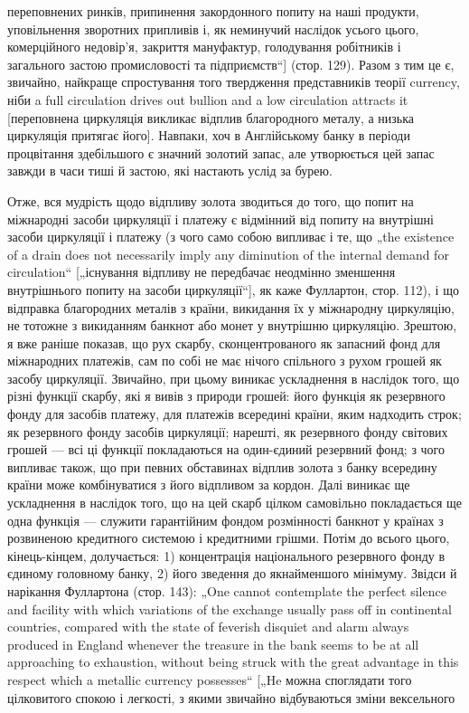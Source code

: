 переповнених ринків, припинення закордонного попиту на наші
продукти, уповільнення зворотних припливів і, як неминучий
наслідок усього цього, комерційного недовір’я, закриття мануфактур,
голодування робітників і загального застою промисловості
та підприємств“] (стор. 129). Разом з тим це є, звичайно,
найкраще спростування того твердження представників теорії
currency, ніби a full circulation drives out bullion and a low circulation
attracts it [переповнена циркуляція викликає відплив благородного
металу, а низька циркуляція притягає його]. Навпаки,
хоч в Англійському банку в періоди процвітання здебільшого є
значний золотий запас, але утворюється цей запас завжди в часи
тиші й застою, які настають услід за бурею.

Отже, вся мудрість щодо відпливу золота зводиться до того,
що попит на міжнародні засоби циркуляції і платежу є відмінний
від попиту на внутрішні засоби циркуляції і платежу (з чого
само собою випливає і те, що „the existence of a drain does not
necessarily imply any diminution of the internal demand for circulation“
[„існування відпливу не передбачає неодмінно зменшення
внутрішнього попиту на засоби циркуляції“], як каже Фуллартон,
стор. 112), і що відправка благородних металів з країни,
викидання їх у міжнародну циркуляцію, не тотожне з викиданням
банкнот або монет у внутрішню циркуляцію. Зрештою,
я вже раніше показав, що рух скарбу, сконцентрованого як запасний
фонд для міжнародних платежів, сам по собі не має
нічого спільного з рухом грошей як засобу циркуляції. Звичайно,
при цьому виникає ускладнення в наслідок того, що різні функції
скарбу, які я вивів з природи грошей: його функція як резервного
фонду для засобів платежу, для платежів всередині
країни, яким надходить строк; як резервного фонду засобів циркуляції;
нарешті, як резервного фонду світових грошей — всі ці
функції покладаються на один-єдиний резервний фонд; з чого випливає
також, що при певних обставинах відплив золота з банку
всередину країни може комбінуватися з його відпливом за кордон.
Далі виникає ще ускладнення в наслідок того, що на цей скарб
цілком самовільно покладається ще одна функція — служити гарантійним
фондом розмінності банкнот у країнах з розвиненою
кредитного системою і кредитними грішми. Потім до всього
цього, кінець-кінцем, долучається: 1) концентрація національного
резервного фонду в єдиному головному банку, 2) його зведення
до якнайменшого мінімуму. Звідси й нарікання Фуллартона
(стор. 143): „One cannot contemplate the perfect silence and facility
with which variations of the exchange usually pass off in continental
countries, compared with the state of feverish disquiet and
alarm always produced in England whenever the treasure in the
bank seems to be at all approaching to exhaustion, without being
struck with the great advantage in this respect which a metallic currency
possesses“ [„He можна споглядати того цілковитого спокою
і легкості, з якими звичайно відбуваються зміни вексельного

